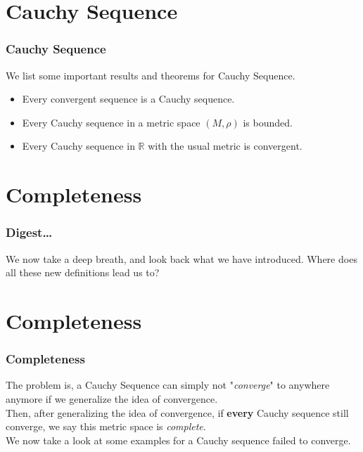 \documentclass[12pt, t]{beamer}
\renewcommand{\emph}[1]{{\color{Turquoise3}\textsl{#1}}}
\begin{document}
\section{Cauchy Sequence}
\begin{frame}
    \frametitle{Cauchy Sequence}
We list some important results and theorems for Cauchy Sequence.
\begin{itemize}
    \item Every convergent sequence is a Cauchy sequence.
    \item Every Cauchy sequence in a metric space $(M,\rho)$ is bounded.
    \item Every Cauchy sequence in $\mathbb{R}$ with the usual metric is convergent.
\end{itemize}
\end{frame}

\section{Completeness}
\begin{frame}
    \frametitle{Digest\dots}
We now take a deep breath, and look back what we have introduced. Where does all these new definitions lead us to?\\

\end{frame}

\section{Completeness}
\begin{frame}
    \frametitle{Completeness}
The problem is, a Cauchy Sequence can simply not "\emph{converge}" to anywhere anymore if we generalize the idea of convergence.\\
\vspace{0.5em}
Then, after generalizing the idea of convergence, if \textbf{every} Cauchy sequence still converge, we say this metric space is 
\emph{complete}.\\
\vspace{0.5em}
We now take a look at some examples for a Cauchy sequence failed to converge.

\end{frame}
\end{document}
